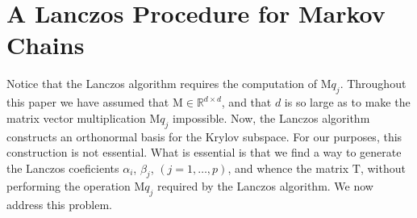 \documentclass[12pt,letterpaper]{report}
\theoremstyle{plain}
\theoremstyle{definition}
\theoremstyle{remark}
\numberwithin{theorem}{chapter}
\numberwithin{claim}{chapter}
\numberwithin{equation}{chapter}
\numberwithin{conjecture}{chapter}
\newcommand\R{\ensuremath{\mathbb{R}}}
\newcommand\M{\ensuremath{\mathrm{M}}}
\newcommand\T{\ensuremath{\mathrm{T}}}
\newcommand\<{\ensuremath{\langle}}
\renewcommand\>{\ensuremath{\rangle}}
\begin{document}
\section{A Lanczos Procedure for Markov Chains}
\label{sec:lancz-proc-mark}
Notice that the Lanczos algorithm requires the computation of $\M q_j$. Throughout this
paper we have assumed that $\M \in \R^{d\times d}$, and that $d$ is so large as
to make the matrix vector multiplication $\M q_j$ impossible. Now, the Lanczos
algorithm constructs an orthonormal basis for the Krylov subspace. For our
purposes, this construction is not essential. What is essential is that we find
a way to generate the Lanczos coeficients $\alpha_i$, $\beta_j$, $(j = 1,\dots, p)$, and
whence the matrix $\T$, without performing the operation $\M q_j$ required by the
Lanczos algorithm. We now address this problem.
\end{document}
